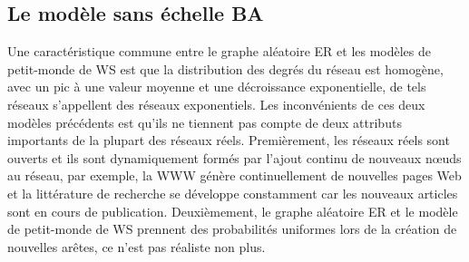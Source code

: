 \subsection{Le modèle sans échelle BA}

Une caractéristique commune entre le graphe aléatoire ER et les modèles de petit-monde de WS est que la distribution des degrés du réseau est homogène, avec un pic à une valeur moyenne et une décroissance exponentielle, de tels réseaux s'appellent des réseaux exponentiels. Les inconvénients de ces deux modèles précédents est qu'ils ne tiennent pas compte de deux attributs importants de la plupart des réseaux réels.  Premièrement, les réseaux réels sont ouverts et ils sont dynamiquement formés par l'ajout continu de nouveaux nœuds au réseau, par exemple, la WWW génère continuellement de nouvelles pages Web et la littérature de recherche se développe constamment car les nouveaux articles sont en cours de publication. Deuxièmement, le graphe aléatoire ER et le modèle de petit-monde de WS prennent des probabilités uniformes lors de la création de nouvelles arêtes, ce n'est pas réaliste non plus.

